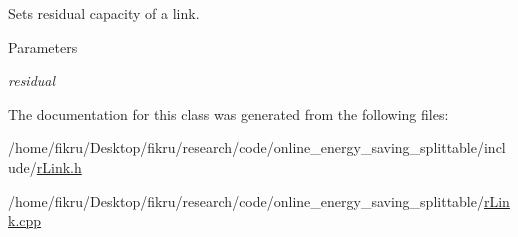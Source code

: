 Sets residual capacity of a link. 


\begin{DoxyParams}{Parameters}
\item[{\em residual}]\end{DoxyParams}


The documentation for this class was generated from the following files:\begin{DoxyCompactItemize}
\item 
/home/fikru/Desktop/fikru/research/code/online\_\-energy\_\-saving\_\-splittable/include/\hyperlink{rLink_8h}{rLink.h}\item 
/home/fikru/Desktop/fikru/research/code/online\_\-energy\_\-saving\_\-splittable/\hyperlink{rLink_8cpp}{rLink.cpp}\end{DoxyCompactItemize}
